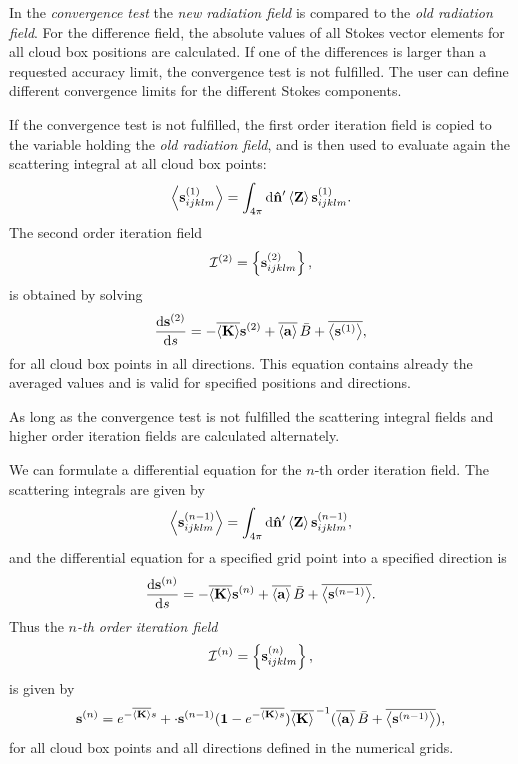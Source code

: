 In the \emph{convergence test} the \emph{new radiation field} is
compared to the \emph{old radiation field}. For the difference field,
the absolute values of all Stokes vector elements for all cloud box
positions are calculated. If one of the differences is larger than a
requested accuracy limit, the convergence test is not fulfilled. The
user can define different convergence limits for the different Stokes
components.

If the convergence test is not fulfilled, the first order iteration
field is copied to the variable holding the \emph{old radiation field}, 
and is then used to evaluate again the scattering integral at all
cloud box points:
\begin{equation}
  \left\langle {\bf s}^{(1)}_{ijklm} \right\rangle = \int_{4\pi} \mathrm{d} {\bf \hat{n}}'
  \left\langle {\bf Z} \right\rangle {\bf s}^{(1)}_{ijklm}.
\end{equation}
The second order iteration field
\begin{equation}
  {\mathcal I}^{(2)} = \left\{{\bf s}^{(2)}_{ijklm}\right\},  
\end{equation}
is obtained by solving
\begin{equation}
  \frac{\mathrm{d} {\bf s}^{(2)}}{\mathrm{d} s} =
  -\overline{\left\langle {\bf K} \right\rangle}  {\bf s}^{(2)} + \overline{\left\langle {\bf a} \right\rangle}\,  \bar{B}
  +\overline{\left\langle {\bf s}^{(1)} \right\rangle},
\end{equation}
for all cloud box points in all directions.  This equation contains
already the averaged values and is valid for specified positions and
directions.

As long as the convergence test is not fulfilled the scattering integral fields and higher order iteration
fields are calculated alternately. 

We can formulate a differential equation for the $n$-th order
iteration field. The scattering integrals are given by
\begin{equation}
 \left\langle {\bf s}^{(n-1)}_{ijklm} \right\rangle = \int_{4\pi} \mathrm{d} {\bf \hat{n}}'
  \left\langle {\bf Z} \right\rangle {\bf s}^{(n-1)}_{ijklm},
\end{equation}
and the differential equation for a specified grid point into a
specified direction is
\begin{equation}
  \frac{\mathrm{d} {\bf s}^{(n)}}{\mathrm{d} s} =
  -\overline{\left\langle {\bf K} \right\rangle}  {\bf s}^{(n)} + \overline{\left\langle {\bf a} \right\rangle} \,\bar{B}
  +\overline{\left\langle {\bf s}^{(n-1)} \right\rangle}.
\end{equation}
Thus the \emph{$n$-th order iteration field }
\begin{equation}
  {\mathcal I}^{(n)} = \left\{ {\bf s}^{(n)}_{ijklm} \right\},  
\end{equation}
is given by
\begin{equation}
  {\bf s}^{(n)} =  e^{-\overline{\left\langle {\bf K} \right\rangle}
    s} + \cdot{\bf s}^{(n-1)}  (\mathbf{1} - e^{-\overline {\left\langle {\bf K} \right\rangle
    s}} ) \overline{\left\langle {\bf K} \right\rangle} ^{\,-1} ( \overline{\left\langle {\bf a} \right\rangle}\,\bar{B} + \overline{\left\langle {\bf s}^{(n-1)} \right\rangle} ),
\end{equation}
for all cloud box points and all directions defined in the numerical
grids.

